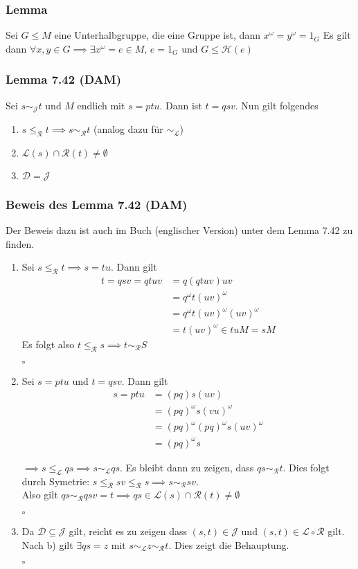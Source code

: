 \documentclass[12pt, german]{article}
\newcommand{\pom}{^{\omega}}
\newcommand{\grel}{\sim_{\mathcal{L}}}
\newcommand{\grer}{\sim_{\mathcal{R}}}
\newcommand{\grej}{\sim_{\mathcal{J}}}
\newcommand{\lgreleq}{\leqslant_{\mathcal{L}}}
\newcommand{\lgrereq}{\leqslant_{\mathcal{R}}}
\newcommand{\bewiesen}{
	
	\begin{flushright}
		$\square$  \\
\end{flushright}}
\begin{document}
	\subsubsection{Lemma}
	Sei $G \leq M$ eine Unterhalbgruppe, die eine Gruppe ist, dann $x\pom = y\pom = 1_G$
	Es gilt dann $\forall x,y \in G \implies \exists x\pom = e \in M, \, e = 1_G$ und $ G \leq \mathcal H(e)$
	
	
	\subsubsection{Lemma 7.42 (DAM)}
	Sei $s \grej t$ und $M$ endlich mit $s = ptu$. Dann ist $t=qsv$. Nun gilt folgendes 
	\begin{enumerate}[label = \alph*)]
		\item $s \lgrereq t \implies s \grer t$ (analog dazu für $\grel$)
		\item $\mathcal{L}(s) \cap \mathcal{R}(t) \not = \emptyset$
		\item $\mathcal{D} = \mathcal{J}$
	\end{enumerate}
	
	\subsubsection{Beweis des Lemma 7.42 \label{dam}(DAM)}
	Der Beweis dazu ist auch im Buch (englischer Version) unter dem Lemma 7.42 zu finden.
	\begin{enumerate}[label = \alph*)]
		\item Sei $s \lgrereq t \implies s = tu$. Dann gilt 
		\begin{align*}
			t=qsv = qtuv&= q(qtuv)uv \\
			&= q\pom t(uv)\pom \\
			&= q\pom t(uv)\pom(uv)\pom \\
			&= t(uv)\pom \in tuM = sM
		\end{align*}
		Es folgt also $t \lgrereq s \implies t \grer S$
		\bewiesen
		
		\item Sei $s=ptu$ und $t=qsv$. Dann gilt 
		\begin{align*}
			s=ptu &= (pq)s(uv) \\
			&=(pq)\pom s(vu)\pom \\
			&= (pq)\pom(pq)\pom s (uv)\pom \\
			&= (pq)\pom s
		\end{align*}
		
		$\implies s \lgreleq qs \implies s \grel qs$. Es bleibt dann zu zeigen, dass $qs \grer t$. 
		Dies folgt durch Symetrie: $s \lgrereq sv \lgrereq s \implies s \grer sv$. \\ 
		Also gilt $qs \grer qsv = t \implies qs \in \mathcal{L}(s) \cap \mathcal{R}(t) \not = \emptyset$
		\bewiesen
		
		\item Da $\mathcal{D} \subseteq \mathcal{J}$ gilt, reicht es zu zeigen dass $(s,t) \in \mathcal{J}$ und $(s,t) \in \mathcal{L} \circ \mathcal{R}$ gilt. 
		Nach b) gilt $\exists qs = z$ mit $s \grel z \grer t$. Dies zeigt die Behauptung.
		\bewiesen
	\end{enumerate}
	
\end{document}
